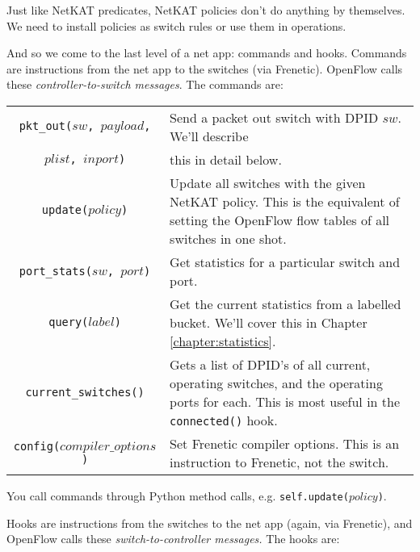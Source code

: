 Just like NetKAT predicates, NetKAT policies don't do anything by themselves.
We need to install policies as switch rules or use them in  operations.  

And so we come to the last level of a net app: commands and hooks.
Commands are instructions from the net app to the switches (via Frenetic).  
OpenFlow calls these \emph{controller-to-switch messages}.  
The commands are:

\bigskip
\begin{tabularx}{\linewidth}{|c|X|}
\hline\hline
\texttt{pkt\_out($sw$, $payload$,} & Send a packet out switch with DPID $sw$.  We'll describe 
\\
\texttt{$plist$, $inport$)} & this in detail below.
\\ \hline  
\texttt{update($policy$)} & 
Update all switches with the given NetKAT policy.
This is the equivalent of setting the OpenFlow flow tables of all switches in one shot.  
\\ \hline  
\texttt{port\_stats($sw$, $port$)} & Get statistics for a particular switch and port. 
\\ \hline  
\texttt{query($label$)} & Get the current statistics from a labelled bucket. 
We'll cover this in Chapter \ref{chapter:statistics}.
\\ \hline  
\texttt{current\_switches()} & Gets a list of DPID's of all current, operating switches, and the operating
ports for each.  
This is most useful in the \texttt{connected()} hook.  
\\ \hline  
\texttt{config($compiler\_options$)} & Set Frenetic compiler options.  
This is an instruction to Frenetic, not the switch. 
\\ \hline\hline
\end{tabularx}

\bigskip
You call commands through Python method calls, e.g. \texttt{self.update($policy$)}.  

Hooks are instructions from the switches to the net app (again, via Frenetic), and OpenFlow
calls these \emph{switch-to-controller messages.}
The hooks are:


